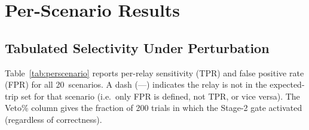 \documentclass[12pt,a4paper]{article}
\begin{document}
\section{Per-Scenario Results}

\subsection{Tabulated Selectivity Under Perturbation}

Table~\ref{tab:perscenario} reports per-relay sensitivity (TPR) and
false positive rate (FPR) for all 20~scenarios.  A dash (---) indicates
the relay is not in the expected-trip set for that scenario (i.e.\ only
FPR is defined, not TPR, or vice versa).  The Veto\% column gives the
fraction of 200 trials in which the Stage-2 gate activated (regardless
of correctness).
\end{document}
